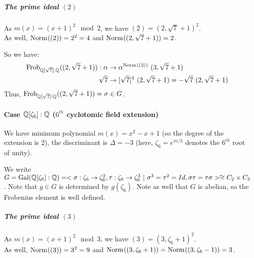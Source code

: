 \subparagraph{The prime ideal $(2)$}
As $m(x) = (x+1)^2 \mod 2$, we have $(2) = (2, \sqrt{7}+1)^2$.\\
As well, $\text{Norm}_{}((2)) = 2^2 = 4$ and $\text{Norm}_{}((2, \sqrt{7}+1)) = 2$.

So we have:
\begin{align*}
    \text{Frob}_{\mathbb{Q}[\sqrt{7}]:\mathbb{Q}}((2, \sqrt{7}+1)): \alpha &\to \alpha^{\text{Norm}_{}((2))} \ (3, \sqrt{7}+1)\\
    \sqrt{7} &\to [\sqrt{7}]^4 \ (2, \sqrt{7}+1) = -\sqrt{7} \ (2, \sqrt{7}+1) 
\end{align*}
Thus, $\text{Frob}_{\mathbb{Q}[\sqrt{7}]:\mathbb{Q}}((2, \sqrt{7}+1)) = \sigma \in G$.

%

\paragraph{Case $\mathbb{Q}[\zeta_6]:\mathbb{Q}$ ($6^{th}$ cyclotomic field extension)}
We have minimum polynomial $m(x)=x^2-x+1$ (so the degree of the extension is 2), the discriminant is $\Delta = -3$ (here, $\zeta_6=e^{\pi i/3}$ denotes the $6^{th}$ root of unity).

We write $G = \Gal{\Q[\zeta_6]:\Q} = < \sigma: \zeta_6 \to \zeta_6^2, \tau: \zeta_6 \to \zeta_6^3 \ | \ \sigma^3=\tau^2=Id, \sigma\tau=\tau\sigma > \cong C_2 \times C_3$.
Note that $g \in G$ is determined by $g(\zeta_6)$.
Note as well that $G$ is abelian, so the Frobenius element is well defined.

\subparagraph{The prime ideal $(3)$}
As $m(x) = (x+1)^2 \mod 3$, we have $(3) = (3, \zeta_6+1)^2$.\\
As well, $\text{Norm}_{}((3)) = 3^2 = 9$ and $\text{Norm}_{}((3, \zeta_6+1)) = \text{Norm}_{}((3, \zeta_6-1)) = 3$.

